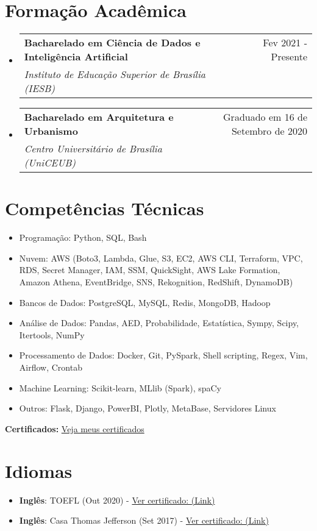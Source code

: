 \documentclass[letterpaper,11pt]{article}%
\makeatletter
\newcommand{\resumeSubheading}[4]{\vspace{-1pt}\item\begin{tabular*}{0.97\textwidth}[t]{l@{\extracolsep{\fill}}r}\textbf{#1} & #2 \\\textit{\small #3} & \textit{\small #4} \\\end{tabular*}\vspace{-8pt}}%
\newcommand{\resumeSubHeadingListStart}{\begin{itemize}[leftmargin=0.15in, label={}, itemsep=0pt, parsep=0pt]}%
\newcommand{\resumeSubHeadingListEnd}{\end{itemize}}%
\newcommand{\resumeItemListStart}{\begin{itemize}[itemsep=0pt, parsep=0pt]}%
\newcommand{\resumeItemListEnd}{\end{itemize}\vspace{-1pt}}%
\makeatother
\begin{document}
%
\section*{Formação Acadêmica}%
\label{sec:FormaoAcadmica}%
\resumeSubHeadingListStart%
\resumeSubheading{Bacharelado em Ciência de Dados e Inteligência Artificial}{Fev 2021 - Presente}{Instituto de Educação Superior de Brasília (IESB)}{}%
\resumeSubHeadingListEnd%
\resumeSubHeadingListStart%
\resumeSubheading{Bacharelado em Arquitetura e Urbanismo}{Graduado em 16 de Setembro de 2020}{Centro Universitário de Brasília (UniCEUB)}{}%
\resumeSubHeadingListEnd

%
\section*{Competências Técnicas}%
\label{sec:CompetnciasTcnicas}%
\begin{multicols}{2}%
\resumeItemListStart%
\item Programação: Python, SQL, Bash%
\item Nuvem: AWS (Boto3, Lambda, Glue, S3, EC2, AWS CLI, Terraform, VPC, RDS, Secret Manager, IAM, SSM, QuickSight, AWS Lake Formation, Amazon Athena, EventBridge, SNS, Rekognition, RedShift, DynamoDB)%
\item Bancos de Dados: PostgreSQL, MySQL, Redis, MongoDB, Hadoop%
\item Análise de Dados: Pandas, AED, Probabilidade, Estatística, Sympy, Scipy, Itertools, NumPy%
\item Processamento de Dados: Docker, Git, PySpark, Shell scripting, Regex, Vim, Airflow, Crontab%
\item Machine Learning: Scikit-learn, MLlib (Spark), spaCy%
\item Outros: Flask, Django, PowerBI, Plotly, MetaBase, Servidores Linux%
\resumeItemListEnd%
\end{multicols}%
\vspace{0.5em}

%
\textbf{Certificados:} \href{https://robertomdiniz.s3.amazonaws.com/accomplishments.html}{Veja meus certificados}%
\section*{Idiomas}%
\label{sec:Idiomas}%
\begin{itemize}[leftmargin=0.15in, label={}]%
\item%
\textbf{Inglês}: TOEFL (Out 2020) - \href{https://github.com/s33ding/my_resume/blob/main/my_certificates/english_TOEFL_my_score.pdf}{Ver certificado: (Link)}%
\item%
\textbf{Inglês}: Casa Thomas Jefferson (Set 2017) - \href{https://github.com/s33ding/my_resume/blob/main/my_certificates/english_Casa%20Thomas%20Jefferson.pdf}{Ver certificado: (Link)}%
\end{itemize}

%
\end{document}
